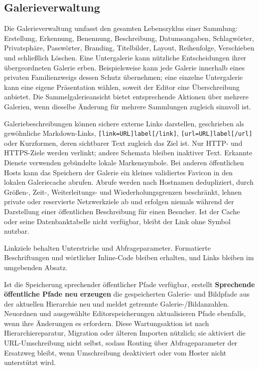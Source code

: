 \documentclass[11pt,a4paper]{article}
\newcommand{\ui}[1]{\textbf{#1}}
\newcommand{\codeword}[1]{\nolinkurl{#1}}
\begin{document}
\subsection{Galerieverwaltung}

Die Galerieverwaltung umfasst den gesamten Lebenszyklus einer Sammlung:
Erstellung, Erkennung, Benennung, Beschreibung, Datumsangaben, Schlagwörter,
Privatsphäre, Passwörter, Branding, Titelbilder, Layout, Reihenfolge,
Verschieben und schließlich Löschen. Eine Untergalerie kann nützliche
Entscheidungen ihrer übergeordneten Galerie erben. Beispielsweise kann jede
Galerie innerhalb eines privaten Familienzweigs dessen Schutz übernehmen; eine
einzelne Untergalerie kann eine eigene Präsentation wählen, soweit der Editor
eine Überschreibung anbietet. Die Sammelgalerieansicht bietet entsprechende
Aktionen über mehrere Galerien, wenn dieselbe Änderung für mehrere Sammlungen
zugleich sinnvoll ist.

Galeriebeschreibungen können sichere externe Links darstellen, geschrieben als
gewöhnliche Markdown-Links, \codeword{[link=URL]label[/link]},
\codeword{[url=URL]label[/url]} oder Kurzformen, deren sichtbarer Text zugleich
das Ziel ist. Nur HTTP- und HTTPS-Ziele werden verlinkt; andere Schemata bleiben
inaktiver Text. Erkannte Dienste verwenden gebündelte lokale Markensymbole. Bei
anderen öffentlichen Hosts kann das Speichern der Galerie ein kleines
validiertes Favicon in den lokalen Galeriecache abrufen. Abrufe werden nach
Hostnamen dedupliziert, durch Größen-, Zeit-, Weiterleitungs- und
Wiederholungsgrenzen beschränkt, lehnen private oder reservierte Netzwerkziele
ab und erfolgen niemals während der Darstellung einer öffentlichen Beschreibung
für einen Besucher. Ist der Cache oder seine Datenbanktabelle nicht verfügbar,
bleibt der Link ohne Symbol nutzbar.

Linkziele behalten Unterstriche und Abfrageparameter. Formatierte Beschriftungen
und wörtlicher Inline-Code bleiben erhalten, und Links bleiben im umgebenden
Absatz.

Ist die Speicherung sprechender öffentlicher Pfade verfügbar, erstellt
\ui{Sprechende öffentliche Pfade neu erzeugen} die gespeicherten Galerie- und
Bildpfade aus der aktuellen Hierarchie neu und meldet getrennte
Galerie-/Bildanzahlen. Neuordnen und ausgewählte Editorspeicherungen
aktualisieren Pfade ebenfalls, wenn ihre Änderungen es erfordern. Diese
Wartungsaktion ist nach Hierarchiereparatur, Migration oder älteren Importen
nützlich; sie aktiviert die URL-Umschreibung nicht selbst, sodass Routing über
Abfrageparameter der Ersatzweg bleibt, wenn Umschreibung deaktiviert oder vom
Hoster nicht unterstützt wird.
\end{document}
